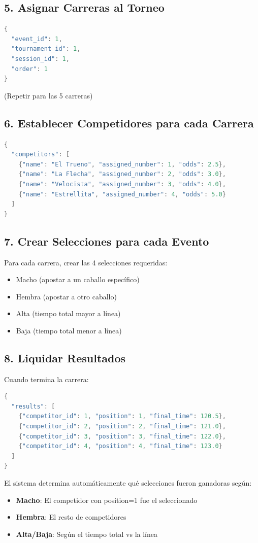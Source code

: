 \documentclass[12pt,a4paper]{article}
\begin{document}
\subsection{5. Asignar Carreras al Torneo}
\begin{lstlisting}[language=c]
{
  "event_id": 1,
  "tournament_id": 1,
  "session_id": 1,
  "order": 1
}
\end{lstlisting}
(Repetir para las 5 carreras)

\subsection{6. Establecer Competidores para cada Carrera}
\begin{lstlisting}[language=c]
{
  "competitors": [
    {"name": "El Trueno", "assigned_number": 1, "odds": 2.5},
    {"name": "La Flecha", "assigned_number": 2, "odds": 3.0},
    {"name": "Velocista", "assigned_number": 3, "odds": 4.0},
    {"name": "Estrellita", "assigned_number": 4, "odds": 5.0}
  ]
}
\end{lstlisting}

\subsection{7. Crear Selecciones para cada Evento}
Para cada carrera, crear las 4 selecciones requeridas:
\begin{itemize}
    \item Macho (apostar a un caballo específico)
    \item Hembra (apostar a otro caballo)
    \item Alta (tiempo total mayor a línea)
    \item Baja (tiempo total menor a línea)
\end{itemize}

\subsection{8. Liquidar Resultados}
Cuando termina la carrera:
\begin{lstlisting}[language=c]
{
  "results": [
    {"competitor_id": 1, "position": 1, "final_time": 120.5},
    {"competitor_id": 2, "position": 2, "final_time": 121.0},
    {"competitor_id": 3, "position": 3, "final_time": 122.0},
    {"competitor_id": 4, "position": 4, "final_time": 123.0}
  ]
}
\end{lstlisting}

El sistema determina automáticamente qué selecciones fueron ganadoras según:
\begin{itemize}
    \item \textbf{Macho}: El competidor con position=1 fue el seleccionado
    \item \textbf{Hembra}: El resto de competidores
    \item \textbf{Alta/Baja}: Según el tiempo total vs la línea
\end{itemize}
\end{document}
